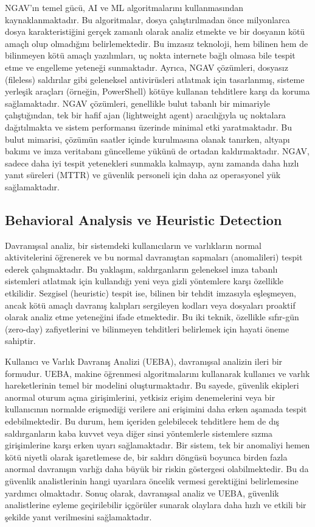 NGAV'ın temel gücü, AI ve ML algoritmalarını kullanmasından kaynaklanmaktadır. Bu algoritmalar, dosya çalıştırılmadan önce milyonlarca dosya karakteristiğini gerçek zamanlı olarak analiz etmekte ve bir dosyanın kötü amaçlı olup olmadığını belirlemektedir. Bu imzasız teknoloji, hem bilinen hem de bilinmeyen kötü amaçlı yazılımları, uç nokta internete bağlı olmasa bile tespit etme ve engelleme yeteneği sunmaktadır. Ayrıca, NGAV çözümleri, dosyasız (fileless) saldırılar gibi geleneksel antivirüsleri atlatmak için tasarlanmış, sisteme yerleşik araçları (örneğin, PowerShell) kötüye kullanan tehditlere karşı da koruma sağlamaktadır. NGAV çözümleri, genellikle bulut tabanlı bir mimariyle çalıştığından, tek bir hafif ajan (lightweight agent) aracılığıyla uç noktalara dağıtılmakta ve sistem performansı üzerinde minimal etki yaratmaktadır. Bu bulut mimarisi, çözümün saatler içinde kurulmasına olanak tanırken, altyapı bakımı ve imza veritabanı güncelleme yükünü de ortadan kaldırmaktadır. NGAV, sadece daha iyi tespit yetenekleri sunmakla kalmayıp, aynı zamanda daha hızlı yanıt süreleri (MTTR) ve güvenlik personeli için daha az operasyonel yük sağlamaktadır.

\subsection{Behavioral Analysis ve Heuristic Detection}

Davranışsal analiz, bir sistemdeki kullanıcıların ve varlıkların normal aktivitelerini öğrenerek ve bu normal davranıştan sapmaları (anomalileri) tespit ederek çalışmaktadır. Bu yaklaşım, saldırganların geleneksel imza tabanlı sistemleri atlatmak için kullandığı yeni veya gizli yöntemlere karşı özellikle etkilidir. Sezgisel (heuristic) tespit ise, bilinen bir tehdit imzasıyla eşleşmeyen, ancak kötü amaçlı davranış kalıpları sergileyen kodları veya dosyaları proaktif olarak analiz etme yeteneğini ifade etmektedir. Bu iki teknik, özellikle sıfır-gün (zero-day) zafiyetlerini ve bilinmeyen tehditleri belirlemek için hayati öneme sahiptir.

Kullanıcı ve Varlık Davranış Analizi (UEBA), davranışsal analizin ileri bir formudur. UEBA, makine öğrenmesi algoritmalarını kullanarak kullanıcı ve varlık hareketlerinin temel bir modelini oluşturmaktadır. Bu sayede, güvenlik ekipleri anormal oturum açma girişimlerini, yetkisiz erişim denemelerini veya bir kullanıcının normalde erişmediği verilere ani erişimini daha erken aşamada tespit edebilmektedir. Bu durum, hem içeriden gelebilecek tehditlere hem de dış saldırganların kaba kuvvet veya diğer sinsi yöntemlerle sistemlere sızma girişimlerine karşı erken uyarı sağlamaktadır. Bir sistem, tek bir anomaliyi hemen kötü niyetli olarak işaretlemese de, bir saldırı döngüsü boyunca birden fazla anormal davranışın varlığı daha büyük bir riskin göstergesi olabilmektedir. Bu da güvenlik analistlerinin hangi uyarılara öncelik vermesi gerektiğini belirlemesine yardımcı olmaktadır. Sonuç olarak, davranışsal analiz ve UEBA, güvenlik analistlerine eyleme geçirilebilir içgörüler sunarak olaylara daha hızlı ve etkili bir şekilde yanıt verilmesini sağlamaktadır.

